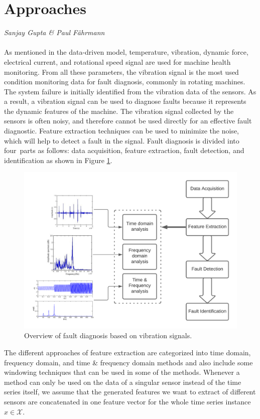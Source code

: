 \section{Approaches}
\vspace*{-15mm}
\hfill{\normalsize\emph{Sanjay Gupta \& Paul Fährmann}}
\label{sec:feature-extraction:approaches}
\\\\
As mentioned in the data-driven model, temperature, vibration, dynamic force, electrical current, and rotational speed signal are used for machine health monitoring. From all these parameters, the vibration signal is the most used condition monitoring data for fault diagnosis, commonly in rotating machines. The system failure is initially identified from the vibration data of the sensors. As a result, a vibration signal can be used to diagnose faults because it represents the dynamic features of the machine. The vibration signal collected by the sensors is often noisy, and therefore cannot be used directly for an effective fault diagnostic. Feature extraction techniques can be used to minimize the noise, which will help to detect a fault in the signal. Fault diagnosis is divided into four parts as follows: data acquisition, feature extraction, fault detection, and identification as shown in Figure \ref{fig:OverviewFaultDiagnosis}.
\begin{figure}[h]
	\centering
	\includegraphics[width=\textwidth]{gfx/Overview of fault diagnosis based on vibration signals.png}
	\captionsetup{justification=centering}
	\caption{Overview of fault diagnosis based on vibration signals.}
	\label{fig:OverviewFaultDiagnosis}
\end{figure}
The different approaches of feature extraction are categorized into time domain, frequency domain, and time \& frequency domain methods and also include some windowing techniques that can be used in some of the methods. Whenever a method can only be used on the data of a singular sensor instead of the time series itself, we assume that the generated features we want to extract of different sensors are concatenated in one feature vector for the whole time series instance $x \in \mathcal{X}$.

